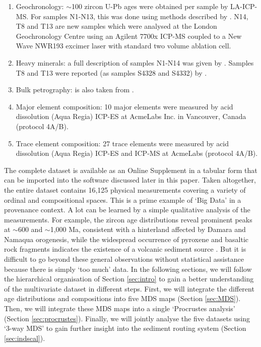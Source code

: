 \documentclass{article}
\begin{document}
\begin{enumerate}
\item{Geochronology:} $\sim$100 zircon U-Pb ages were obtained per
  sample by LA-ICP-MS. For samples N1-N13, this was done using methods
  described by \citet{vermeesch2010b}.  N14, T8 and T13 are new
  samples which were analysed at the London Geochronology Centre using
  an Agilent 7700x ICP-MS coupled to a New Wave NWR193 excimer laser
  with standard two volume ablation cell.
\item{Heavy minerals:} a full description of samples N1-N14 was given
  by \citet{garzanti2012}. Samples T8 and T13 were reported (as
  samples S4328 and S4332) by \citet{garzanti2014b,garzanti2014c}.
\item{Bulk petrography:} is also taken from
  \citet{garzanti2012,garzanti2014b,garzanti2014c}.
\item{Major element composition:} 10 major elements were measured by
  acid dissolution (Aqua Regia) ICP-ES at AcmeLabs Inc. in Vancouver,
  Canada (protocol 4A/B).
\item{Trace element composition: 27 trace elements were measured by
  acid dissolution (Aqua Regia) ICP-ES and ICP-MS at AcmeLabs
  (protocol 4A/B).}
\end{enumerate}

The complete dataset is available as an Online Supplement in a tabular
form that can be imported into the software discussed later in this
paper.  Taken altogether, the entire dataset contains 16,125 physical
measurements covering a variety of ordinal and compositional
spaces. This is a prime example of `Big Data' in a provenance
context. A lot can be learned by a simple qualitative analysis of the
measurements. For example, the zircon age distributions reveal
prominent peaks at $\sim$600 and $\sim$1,000 Ma, consistent with a
hinterland affected by Damara and Namaqua orogenesis, while the
widespread occurrence of pyroxene and basaltic rock fragments
indicates the existence of a volcanic sediment source
\citep{garzanti2012, garzanti2014b}. But it is difficult to go beyond
these general observations without statistical assistance because
there is simply `too much' data. In the following sections, we will
follow the hierarchical organisation of Section \ref{sec:intro} to
gain a better understanding of the multivariate dataset in different
steps. First, we will integrate the different age distributions and
compositions into five MDS maps (Section \ref{sec:MDS}). Then, we will
integrate these MDS maps into a single `Procrustes analysis' (Section
\ref{sec:procrustes}).  Finally, we will jointly analyse the five
datasets using `3-way MDS' to gain further insight into the sediment
routing system (Section \ref{sec:indscal}).
\end{document}
